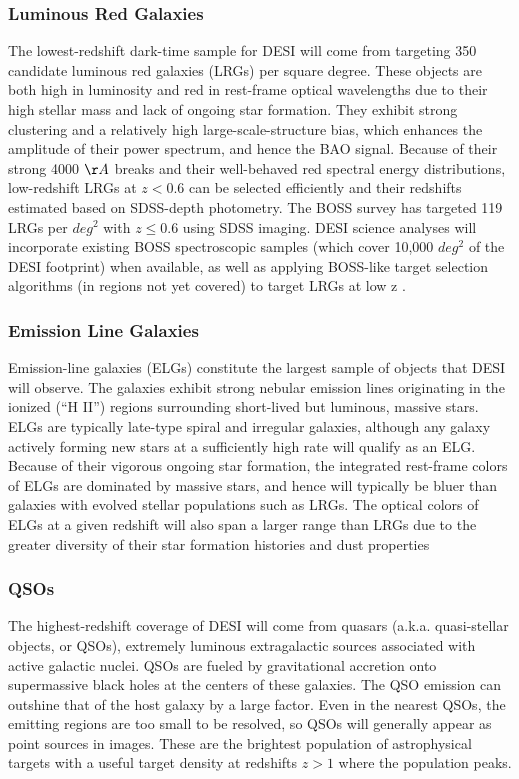 \subsubsection{Luminous Red Galaxies}
The lowest-redshift dark-time sample for DESI will come from targeting 350 candidate luminous
red galaxies (LRGs) per square degree. These objects are both high in luminosity and red in
rest-frame optical wavelengths due to their high stellar mass and lack of ongoing star formation.
They exhibit strong clustering and a relatively high large-scale-structure bias, which enhances the
amplitude of their power spectrum, and hence the BAO signal. Because of their
strong 4000 $\AA$  breaks and their well-behaved red spectral energy distributions, low-redshift LRGs
at $z < 0.6$ can be selected efficiently and their redshifts estimated based on SDSS-depth photometry. The BOSS survey has targeted 119 LRGs per $deg^2$ with $z \leq 0.6$ using SDSS imaging. DESI science analyses will incorporate existing BOSS spectroscopic samples (which cover 10,000
$deg^2$ of the DESI footprint) when available, as well as applying BOSS-like target selection algorithms
(in regions not yet covered) to target LRGs at low z \cite{Aghamousa:2016zmz}.
\subsubsection{Emission Line Galaxies}
Emission-line galaxies (ELGs) constitute the largest sample of objects that DESI will observe.
The galaxies exhibit strong nebular emission lines originating in the ionized (“H II”) regions
surrounding short-lived but luminous, massive stars. ELGs are typically late-type spiral and
irregular galaxies, although any galaxy actively forming new stars at a sufficiently high rate
will qualify as an ELG. Because of their vigorous ongoing star formation, the integrated
rest-frame colors of ELGs are dominated by massive stars, and hence will typically be bluer
than galaxies with evolved stellar populations such as LRGs. The optical colors of ELGs at
a given redshift will also span a larger range than LRGs due to the greater diversity of their
star formation histories and dust properties
\subsubsection{QSOs}
The highest-redshift coverage of DESI will come from quasars (a.k.a. quasi-stellar objects,
or QSOs), extremely luminous extragalactic sources associated with active galactic nuclei.
QSOs are fueled by gravitational accretion onto supermassive black holes at the centers of
these galaxies. The QSO emission can outshine that of the host galaxy by a large factor.
Even in the nearest QSOs, the emitting regions are too small to be resolved, so QSOs
will generally appear as point sources in images. These are the brightest population of
astrophysical targets with a useful target density at redshifts $z > 1$ where the population
peaks.
